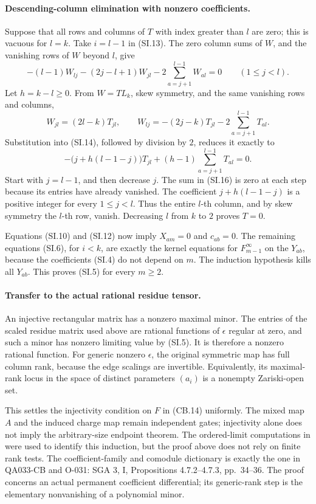 \paragraph{Descending-column elimination with nonzero coefficients.}
Suppose that all rows and columns of \(T\) with index
greater than \(l\) are zero; this is vacuous for \(l=k\).
Take \(i=l-1\) in (SI.13).
The zero column sums of \(W\), and the vanishing rows of
\(W\) beyond \(l\), give
\[
 -(l-1)W_{lj}-(2j-l+1)W_{jl}
             -2\sum_{a=j+1}^{l-1}W_{al}=0
                              \qquad(1\leq j<l).
                                                               \tag{SI.14}
\]
Let \(h=k-l\geq0\). From \(W=T L_k\), skew symmetry,
and the same vanishing rows and columns,
\[
 W_{jl}=(2l-k)T_{jl},\qquad
 W_{lj}=-(2j-k)T_{jl}
                       -2\sum_{a=j+1}^{l-1}T_{al}.
                                                               \tag{SI.15}
\]
Substitution into (SI.14), followed by division by \(2\),
reduces it exactly to
\[
 -\bigl(j+h(l-1-j)\bigr)T_{jl}
                    +(h-1)\sum_{a=j+1}^{l-1}T_{al}=0.
                                                               \tag{SI.16}
\]
Start with \(j=l-1\), and then decrease \(j\).
The sum in (SI.16) is zero at each step because its entries
have already vanished. The coefficient
\(j+h(l-1-j)\) is a positive integer for every
\(1\leq j<l\). Thus the entire \(l\)-th column, and by
skew symmetry the \(l\)-th row, vanish.
Decreasing \(l\) from \(k\) to \(2\) proves \(T=0\).

Equations (SI.10) and (SI.12) now imply
\(X_{am}=0\) and \(c_{ab}=0\). The remaining equations
(SI.6), for \(i<k\), are exactly the kernel equations
for \(F_{m-1}^\infty\) on the \(Y_{ab}\), because
the coefficients (SI.4) do not depend on \(m\).
The induction hypothesis kills all \(Y_{ab}\).
This proves (SI.5) for every \(m\geq2\).

\paragraph{Transfer to the actual rational residue tensor.}
An injective rectangular matrix has a nonzero maximal
minor. The entries of the scaled residue matrix used
above are rational functions of \(\epsilon\) regular
at zero, and such a minor has nonzero limiting value
by (SI.5). It is therefore a nonzero rational function.
For generic nonzero \(\epsilon\), the original symmetric
map has full column rank, because the edge scalings
are invertible. Equivalently, its maximal-rank locus
in the space of distinct parameters \((a_i)\) is a
nonempty Zariski-open set.

This settles the injectivity condition on \(F\) in
(CB.14) uniformly. The mixed map \(A\) and the induced
charge map remain independent gates; injectivity alone
does not imply the arbitrary-size endpoint theorem.
The ordered-limit computations in
were used to identify this induction, but the proof
above does not rely on finite rank tests.
The coefficient-family and comodule dictionary is exactly
the one in QA033-CB and O-031: SGA 3, I, Propositions
4.7.2--4.7.3, pp.~34--36. The proof concerns an actual
permanent coefficient differential; its generic-rank step
is the elementary nonvanishing of a polynomial minor.
